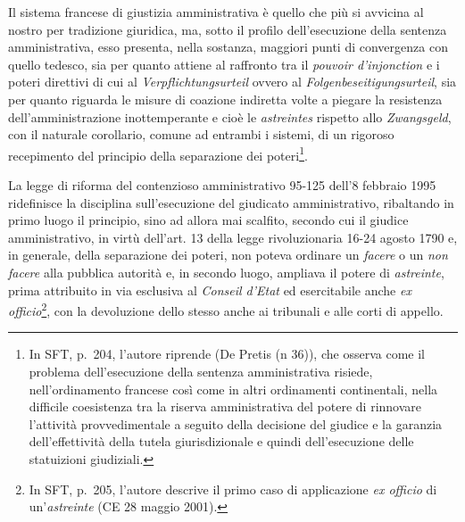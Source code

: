 \documentclass[12pt,it,a4paper,]{report}
\begin{document}
Il sistema francese di giustizia amministrativa è quello che più si
avvicina al nostro per tradizione giuridica, ma, sotto il profilo
dell'esecuzione della sentenza amministrativa, esso presenta, nella
sostanza, maggiori punti di convergenza con quello tedesco, sia per
quanto attiene al raffronto tra il \emph{pouvoir d'injonction} e i
poteri direttivi di cui al \emph{Verpflichtungsurteil} ovvero al
\emph{Folgenbeseitigungsurteil}, sia per quanto riguarda le misure di
coazione indiretta volte a piegare la resistenza dell'amministrazione
inottemperante e cioè le \emph{astreintes} rispetto allo
\emph{Zwangsgeld}, con il naturale corollario, comune ad entrambi i
sistemi, di un rigoroso recepimento del principio della separazione dei
poteri\footnote{In SFT, p.~204, l'autore riprende (De Pretis (n 36)),
  che osserva come il problema dell'esecuzione della sentenza
  amministrativa risiede, nell'ordinamento francese così come in altri
  ordinamenti continentali, nella difficile coesistenza tra la riserva
  amministrativa del potere di rinnovare l'attività provvedimentale a
  seguito della decisione del giudice e la garanzia dell'effettività
  della tutela giurisdizionale e quindi dell'esecuzione delle
  statuizioni giudiziali.}.

La legge di riforma del contenzioso amministrativo 95-125 dell'8
febbraio 1995 ridefinisce la disciplina sull'esecuzione del giudicato
amministrativo, ribaltando in primo luogo il principio, sino ad allora
mai scalfito, secondo cui il giudice amministrativo, in virtù dell'art.
13 della legge rivoluzionaria 16-24 agosto 1790 e, in generale, della
separazione dei poteri, non poteva ordinare un \emph{facere} o un
\emph{non facere} alla pubblica autorità e, in secondo luogo, ampliava
il potere di \emph{astreinte}, prima attribuito in via esclusiva al
\emph{Conseil d'Etat} ed esercitabile anche \emph{ex
officio}\footnote{In SFT, p.~205, l'autore descrive il primo caso di
  applicazione \emph{ex officio} di un'\emph{astreinte} (CE 28 maggio
  2001).}, con la devoluzione dello stesso anche ai tribunali e alle
corti di appello.
\end{document}
